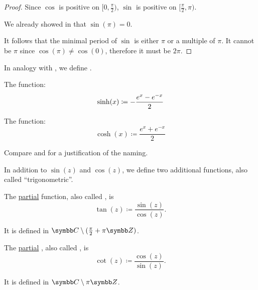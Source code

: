 \begin{proof}
  Since \( \cos \) is positive on \( [0, \tfrac \pi 2) \), \( \sin \) is positive on \( [\tfrac \pi 2, \pi) \).

  We already showed in  that \( \sin(\pi) = 0 \).

  It follows that the minimal period of \( \sin \) is either \( \pi \) or a multiple of \( \pi \). It cannot be \( \pi \) since \( \cos(\pi) \neq \cos(0) \), therefore it must be \( 2\pi \).
\end{proof}

\begin{definition}\label{def:hyperbolic_trigonometric_functions}
  In analogy with , we define .

  \begin{DefEnum}
     The  function:
    \begin{equation*}
      \sinh(x) \coloneqq - \frac {e^x - e^{-x}} 2 \\
    \end{equation*}

     The  function:
    \begin{equation*}
      \cosh(x) \coloneqq \frac {e^x + e^{-x}} 2
    \end{equation*}
  \end{DefEnum}

  Compare  and  for a justification of the naming.
\end{definition}

\begin{definition}\label{def:derived_trigonometric_functions}
  In addition to \( \sin(z) \) and \( \cos(z) \), we define two additional functions, also called \enquote{trigonometric}.

  \begin{DefEnum}
     The \hyperref[def:function/partial]{partial}  function, also called , is
    \begin{equation*}
      \tan(z) \coloneqq \frac {\sin(z)} {\cos(z)}.
    \end{equation*}

    It is defined in \( \BC \setminus (\tfrac \pi 2 + \pi\BZ) \).

     The \hyperref[def:function/partial]{partial} , also called , is
    \begin{equation*}
      \cot(z) \coloneqq \frac {\cos(z)} {\sin(z)}.
    \end{equation*}

    It is defined in \( \BC \setminus \pi\BZ \).
  \end{DefEnum}
\end{definition}

